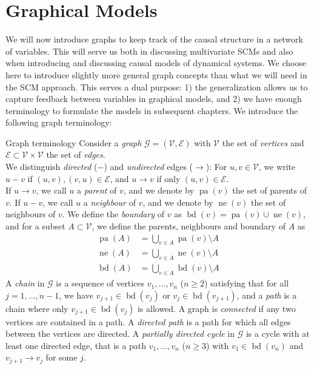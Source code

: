 \documentclass[11pt, a4paper]{memoir}
\theoremstyle{break}
\theoremstyle{break}
\theoremstyle{nonumberplain}
\DeclareMathOperator{\pa}{pa}
\DeclareMathOperator{\nei}{ne}
\DeclareMathOperator{\bd}{bd}
\begin{document}
\section{Graphical Models}\label{graphmod}
We will now introduce graphs to keep track of the causal structure in a network of variables. This will serve us both in discussing multivariate SCMs and also when introducing and discussing causal models of dynamical systems. We choose here to introduce slightly more general graph concepts than what we will need in the SCM approach. This serves a dual purpose: 1) the generalization allows us to capture feedback between variables in graphical models, and 2) we have enough terminology to formulate the models in subsequent chapters. We introduce the following graph terminology:
\begin{mydefinition}{Graph terminology}
Consider a \emph{graph} $\mathcal{G}=(\mathcal{V},\mathcal{E})$ with $\mathcal{V}$ the set of \emph{vertices} and $\mathcal{E}\subset \mathcal{V}\times \mathcal{V}$ the set of \emph{edges}.\\[5pt]
We distinguish \textit{directed} ($-$) and \textit{undirected} edges ($\to$): For $u,v\in \mathcal{V}$, we write $u-v$ if $(u,v),(v,u)\in \mathcal{E}$, and $u\to v$ if only $(u,v)\in \mathcal{E}$. \\[5pt]
If $u\to v$, we call $u$ a \emph{parent} of $v$, and we denote by $\pa(v)$ the set of parents of $v$. If $u-v$, we call $u$ a \emph{neighbour} of $v$, and we denote by $\nei(v)$ the set of neighbours of $v$. We define the \emph{boundary} of $v$ as $\bd(v)=\pa(v)\cup \nei(v)$, and for a subset $A\subset \mathcal{V}$, we define the parents, neighbours and boundary of $A$ as
\begin{align*}
\pa(A)&=\bigcup_{v\in A}\pa(v)\setminus A\\
 \nei(A)&=\bigcup_{v\in A}\nei(v)\setminus A\\
 \bd(A)&=\bigcup_{v\in A}\bd(v)\setminus A
\end{align*}
A \emph{chain} in $\mathcal{G}$ is a sequence of vertices $v_1,\ldots, v_n$ ($n \geqslant 2$) satisfying that for all $j=1,\ldots,n-1$, we have $v_{j+1}\in \bd(v_j)$ or $v_{j}\in \bd(v_{j+1})$, and a \emph{path} is a chain  where only $v_{j+1}\in \bd(v_j)$ is allowed. A graph is \emph{connected} if any two vertices are contained in a path. A \emph{directed path} is a path for which all edges between the vertices are directed. A \textit{partially directed cycle} in $\mathcal{G}$ is a cycle with at least one directed edge, that is a path $v_1,\ldots, v_n$ ($n \geqslant 3$) with $v_1\in \bd(v_n)$ and $v_{j+1}\to v_j$ for some $j$.\\[5pt]

\end{mydefinition}
\end{document}
